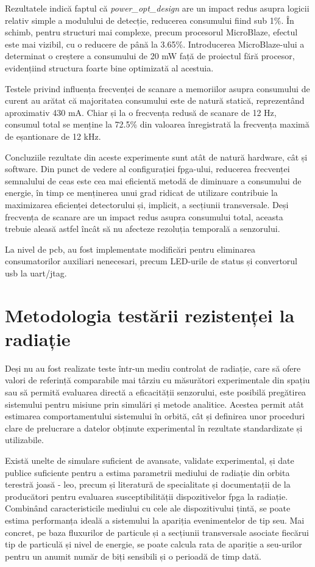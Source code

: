 \documentclass[12pt,a4paper]{report}
\begin{document}
Rezultatele indică faptul că \textit{power\_opt\_design} are un impact redus asupra logicii relativ simple a modulului de detecție, reducerea consumului fiind sub 1\%. În schimb, pentru structuri mai complexe, precum procesorul MicroBlaze, efectul este mai vizibil, cu o reducere de până la 3.65\%. Introducerea MicroBlaze-ului a determinat o creștere a consumului de 20 mW față de proiectul fără procesor, evidențiind structura foarte bine optimizată al acestuia.

Testele privind influența frecvenței de scanare a memoriilor asupra consumului de curent au arătat că majoritatea consumului este de natură statică, reprezentând aproximativ 430 mA. Chiar și la o frecvența redusă de scanare de 12 Hz, consumul total se menține la 72.5\% din valoarea înregistrată la frecvența maximă de eșantionare de 12 kHz. 

Concluziile rezultate din aceste experimente sunt atât de natură hardware, cât și software. Din punct de vedere al configurației \gls{fpga}-ului, reducerea frecvenței semnalului de ceas este cea mai eficientă metodă de diminuare a consumului de energie, în timp ce menținerea unui grad ridicat de utilizare contribuie la maximizarea eficienței detectorului și, implicit, a secțiunii transversale. Deși frecvența de scanare are un impact redus asupra consumului total, aceasta trebuie aleasă astfel încât să nu afecteze rezoluția temporală a senzorului.

La nivel de \gls{pcb}, au fost implementate modificări pentru eliminarea consumatorilor auxiliari nenecesari, precum LED-urile de status și convertorul \gls{usb} la \gls{uart}/\gls{jtag}.

\section{Metodologia testării rezistenței la radiație}
Deși nu au fost realizate teste într-un mediu controlat de radiație, care să ofere valori de referință comparabile mai târziu cu măsurători experimentale din spațiu sau să permită evaluarea directă a eficacității senzorului, este posibilă pregătirea sistemului pentru misiune prin simulări și metode analitice. Acestea permit atât estimarea comportamentului sistemului în orbită, cât și definirea unor proceduri clare de prelucrare a datelor obținute experimental în rezultate standardizate și utilizabile. 

Există unelte de simulare suficient de avansate, validate experimental, și date publice suficiente pentru a estima parametrii mediului de radiație din orbita terestră joasă - \gls{leo}, precum și literatură de specialitate și documentații de la producători pentru evaluarea susceptibilității dispozitivelor \gls{fpga} la radiație. Combinând caracteristicile mediului cu cele ale dispozitivului țintă, se poate estima performanța ideală a sistemului la apariția evenimentelor de tip \gls{seu}. Mai concret, pe baza fluxurilor de particule și a secțiunii transversale asociate fiecărui tip de particulă și nivel de energie, se poate calcula rata de apariție a \gls{seu}-urilor pentru un anumit număr de biți sensibili și o perioadă de timp dată.
\end{document}

